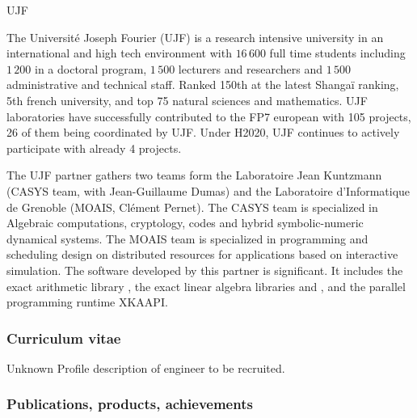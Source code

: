 \begin{sitedescription}{UJF}



The Université Joseph Fourier (UJF)  is a research intensive university in an
international and high tech environment with $16\,600$ full time students
including $1\,200$ in a doctoral program, $1\,500$ lecturers and researchers and
$1\,500$ administrative and technical staff. Ranked 150th at the latest Shanga\"i
ranking, 5th french university, and top 75 natural sciences and mathematics.
UJF laboratories have successfully contributed to the FP7 european with 
105 projects, 26 of them being coordinated by UJF. Under H2020, UJF continues to
actively participate with already 4 projects.

The UJF partner gathers two teams form the Laboratoire Jean Kuntzmann
(CASYS team, with Jean-Guillaume Dumas) and the Laboratoire d’Informatique de
Grenoble (MOAIS, Clément Pernet). The 
CASYS team is specialized in Algebraic computations, cryptology, codes and hybrid symbolic-numeric dynamical systems. The MOAIS team is specialized in programming and scheduling
design on distributed resources for applications based on interactive simulation. The software
developed by this partner is significant. It includes the exact arithmetic
library \Givaro, the exact linear algebra libraries \fflas and \Linbox, and the
parallel programming runtime XKAAPI.

\subsubsection*{Curriculum vitae}





%

\begin{participant}[type=R,PM=24,salary=4200,gender=]{Unknown}
Profile description of engineer to be recruited.
\end{participant}
\subsubsection*{Publications, products, achievements}


\end{sitedescription}
